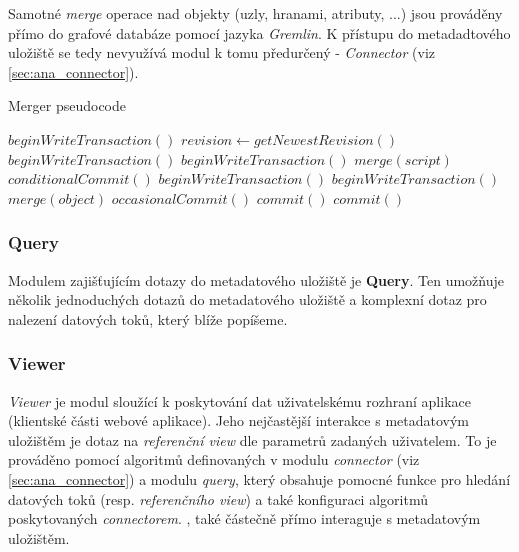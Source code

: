 Samotné \textit{merge} operace nad objekty (uzly, hranami, atributy, ...) jsou prováděny přímo do grafové databáze pomocí jazyka \textit{Gremlin}. K přístupu do metadadtového uložiště se tedy nevyužívá modul k tomu předurčený - \textit{Connector} (viz \ref{sec:ana_connector}).

\begin{algorithm} 
\caption{Merger pseudocode}
\label{alg_merger}
\begin{algorithmic}
	\State $beginWriteTransaction()$
	\State $revision\gets getNewestRevision()$
		\State $beginWriteTransaction()$
			\State $beginWriteTransaction()$
			\State $merge(script)$	
			\State $conditionalCommit()$
		\EndFor
		\State $beginWriteTransaction()$
			\State $beginWriteTransaction()$
			\State $merge(object)$	
			\State $occasionalCommit()$
		\EndFor
		\State $commit()$	
	\EndIf
	\State $commit()$
\end{algorithmic}
\end{algorithm}


\subsubsection{Query}
Modulem zajišťujícím dotazy do metadatového uložiště je \textbf{Query}. Ten umožňuje několik jednoduchých dotazů do metadatového uložiště a komplexní dotaz pro nalezení datových toků, který blíže popíšeme.  


\subsubsection{Viewer}
\label{sec:ana_viewer}
\textit{Viewer} je modul sloužící k poskytování dat uživatelskému rozhraní aplikace (klientské části webové aplikace). Jeho nejčastější interakce s metadatovým uložištěm je dotaz na \textit{referenční view} dle parametrů zadaných uživatelem. To je prováděno pomocí algoritmů definovaných v modulu \textit{connector} (viz \ref{sec:ana_connector}) a modulu \textit{query}, který obsahuje pomocné funkce pro hledání datových toků (resp. \textit{referenčního view}) a také konfiguraci algoritmů poskytovaných \textit{connectorem}.  , také částečně přímo interaguje s metadatovým uložištěm. 

